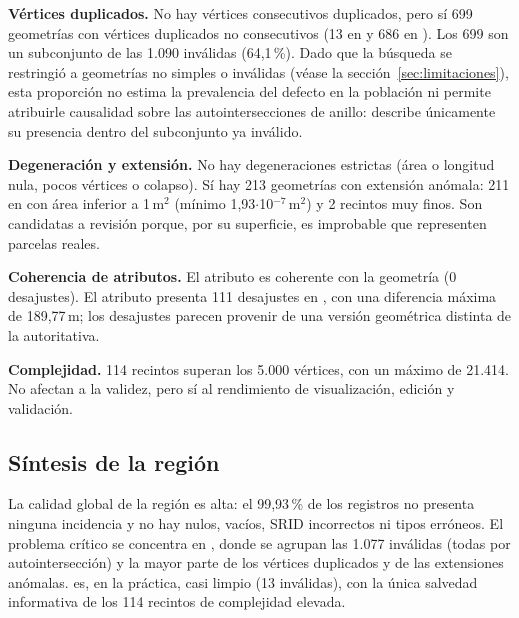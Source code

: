 \textbf{Vértices duplicados.} No hay vértices consecutivos duplicados, pero sí 699 geometrías con vértices duplicados no consecutivos (13 en  y 686 en ). Los 699 son un subconjunto de las 1.090 inválidas (64,1\,\%). Dado que la búsqueda se restringió a geometrías no simples o inválidas (véase la sección~\ref{sec:limitaciones}), esta proporción no estima la prevalencia del defecto en la población ni permite atribuirle causalidad sobre las autointersecciones de anillo: describe únicamente su presencia dentro del subconjunto ya inválido.

\textbf{Degeneración y extensión.} No hay degeneraciones estrictas (área o longitud nula, pocos vértices o colapso). Sí hay 213 geometrías con extensión anómala: 211 en  con área inferior a 1\,m$^{2}$ (mínimo 1,93$\cdot$10$^{-7}$\,m$^{2}$) y 2 recintos muy finos. Son candidatas a revisión porque, por su superficie, es improbable que representen parcelas reales.

\textbf{Coherencia de atributos.} El atributo  es coherente con la geometría (0 desajustes). El atributo  presenta 111 desajustes en , con una diferencia máxima de 189,77\,m; los desajustes parecen provenir de una versión geométrica distinta de la autoritativa.

\textbf{Complejidad.} 114 recintos superan los 5.000 vértices, con un máximo de 21.414. No afectan a la validez, pero sí al rendimiento de visualización, edición y validación.

\subsection{Síntesis de la región}

La calidad global de la región es alta: el 99,93\,\% de los registros no presenta ninguna incidencia y no hay nulos, vacíos, SRID incorrectos ni tipos erróneos. El problema crítico se concentra en , donde se agrupan las 1.077 inválidas (todas por autointersección) y la mayor parte de los vértices duplicados y de las extensiones anómalas.  es, en la práctica, casi limpio (13 inválidas), con la única salvedad informativa de los 114 recintos de complejidad elevada.

